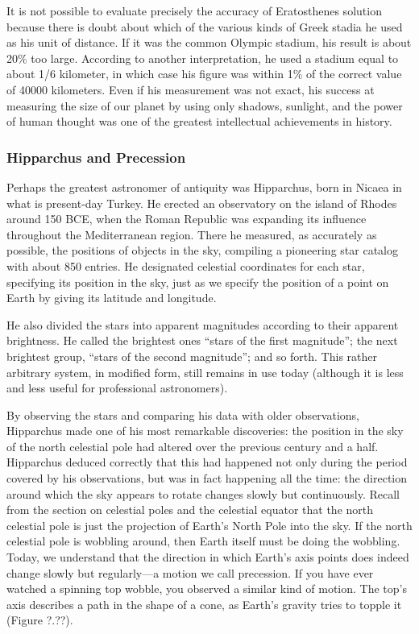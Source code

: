 \documentclass[../../main-astronomy.tex]{subfiles}
\begin{document}

\vspace{1em}

It is not possible to evaluate precisely the accuracy of Eratosthenes solution because there is doubt about which of the various kinds of Greek stadia he used as his unit of distance. If it was the common Olympic stadium, his result is about 20\% too large. According to another interpretation, he used a stadium equal to about 1/6 kilometer, in which case his figure was within 1\% of the correct value of \num{40000} kilometers. Even if his measurement was not exact, his success at measuring the size of our planet by using only shadows, sunlight, and the power of human thought was one of the greatest intellectual achievements in history.

\subsubsection*{Hipparchus and Precession}

Perhaps the greatest astronomer of antiquity was Hipparchus, born in Nicaea in what is present-day Turkey. He erected an observatory on the island of Rhodes around 150 BCE, when the Roman Republic was expanding its influence throughout the Mediterranean region. There he measured, as accurately as possible, the positions of objects in the sky, compiling a pioneering star catalog with about 850 entries. He designated celestial coordinates for each star, specifying its position in the sky, just as we specify the position of a point on Earth by giving its latitude and longitude.

\vspace{1em}

He also divided the stars into \gls{apparent magnitude}s according to their apparent brightness. He called the brightest ones ``stars of the first magnitude''; the next brightest group, ``stars of the second magnitude''; and so forth. This rather arbitrary system, in modified form, still remains in use today (although it is less and less useful for professional astronomers).

\vspace{1em}

By observing the stars and comparing his data with older observations, Hipparchus made one of his most remarkable discoveries: the position in the sky of the north celestial pole had altered over the previous century and a half. Hipparchus deduced correctly that this had happened not only during the period covered by his observations, but was in fact happening all the time: the direction around which the sky appears to rotate changes slowly but continuously. Recall from the section on celestial poles and the celestial equator that the north celestial pole is just the projection of Earth's North Pole into the sky. If the north celestial pole is wobbling around, then Earth itself must be doing the wobbling. Today, we understand that the direction in which Earth's axis points does indeed change slowly but regularly---a motion we call precession. If you have ever watched a spinning top wobble, you observed a similar kind of motion. The top's axis describes a path in the shape of a cone, as Earth's gravity tries to topple it (Figure ?.??).
\end{document}
